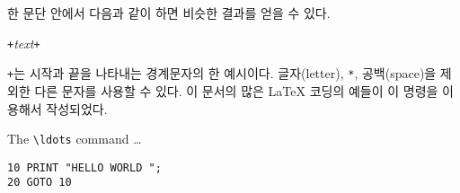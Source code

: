 한 문단 안에서 다음과 같이 하면 비슷한 결과를 얻을 수 있다.
\begin{lscommand}
\verb|+|\emph{text}\verb|+|
\end{lscommand}
\noindent \verb|+|는 시작과 끝을 나타내는 경계문자의 한 예시이다. 글자(letter), \verb|*|, 공백(space)을
제외한 다른 문자를 사용할 수 있다. 이 문서의 많은 \LaTeX{} 코딩의 예들이 이 명령을 이용해서 작성되었다.



\begin{example}
The \verb|\ldots| command \ldots

\begin{verbatim}
10 PRINT "HELLO WORLD ";
20 GOTO 10
\end{verbatim}
\end{example}

\vspace{-.5\onelineskip}

